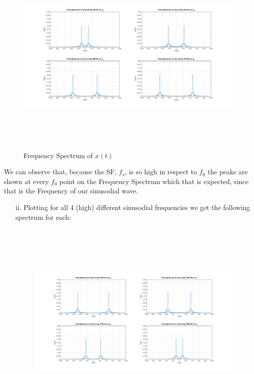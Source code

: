 \documentclass[12pt, a4paper]{article}
\begin{document}
\begin{enumerate}
\begin{enumerate}
\begin{figure}[H]
            \includegraphics[width=\textwidth, height=10cm]{3_B_1.png}
            \caption{Frequency Spectrum of \(x(t)\)}
        \end{figure}
    \end{enumerate}
    We can observe that, because the SF, \(f_s\), is so high in respect to \(f_0\) the peaks are shown at every \(f_0\)
    point on the Frequency Spectrum which that is expected, since that is the Frequency of our sinusodial wave.
    \pagebreak
    \begin{enumerate}
        \item[ii.]Plotting for all 4 (high) different sinusodial frequencies we get the following spectrum for each:   
        \begin{figure}[H]
            \centering
            \includegraphics[width=\textwidth, height=10cm]{3_B_2.png}

\end{figure}
\end{enumerate}
\end{enumerate}
\end{document}

